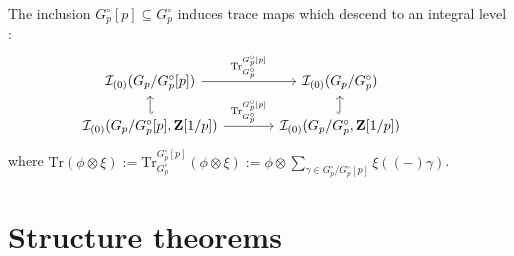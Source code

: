 \documentclass{amsart}%
\theoremstyle{plain}
\theoremstyle{plain}
\theoremstyle{remark}
\begin{document}
\noindent The inclusion $G_p^\circ[p]\subseteq G_p^\circ$ induces trace maps which descend to an integral level \cite[Proposition $3.2.3$]{Loeffler_2021}:
\[\begin{tikzcd}[sep=scriptsize]
	{\mathcal{I}_{(0)}(G_p/G_p^\circ[p])} && {\mathcal{I}_{(0)}(G_p/G_p^\circ)} & {} \\
	{\mathcal{I}_{(0)}(G_p/G_p^\circ[p],\mathbf{Z}[1/p])} && {\mathcal{I}_{(0)}(G_p/G_p^\circ,\mathbf{Z}[1/p])}
	\arrow["{\mathrm{Tr}^{G_p^\circ[p]}_{G_p^\circ}}", from=1-1, to=1-3]
	\arrow[hook', from=2-1, to=1-1]
	\arrow["{\mathrm{Tr}^{G_p^\circ[p]}_{G_p^\circ}}", from=2-1, to=2-3]
	\arrow[hook, from=2-3, to=1-3]
\end{tikzcd}\]
where $\mathrm{Tr}(\phi\otimes \xi):=\mathrm{Tr}^{G_p^\circ[p]}_{G_p^\circ}(\phi\otimes \xi):=\phi\otimes\sum_{\gamma\in G_p^\circ/G_p^\circ[p]}\xi((-)\gamma)$.


  
\section{Structure theorems}\label{section structure theorems}
\end{document}
